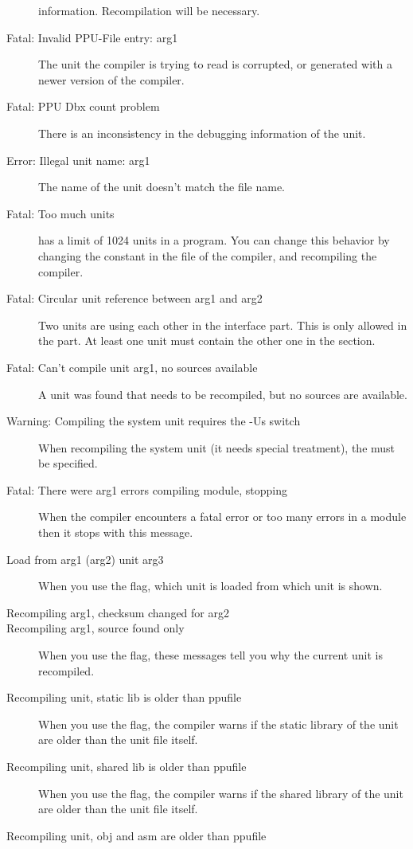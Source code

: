 \begin{description}
 information. Recompilation will be necessary.
\item [Fatal: Invalid PPU-File entry: arg1]
 The unit the compiler is trying to read is corrupted, or generated with a
 newer version of the compiler.
\item [Fatal: PPU Dbx count problem]
 There is an inconsistency in the debugging information of the unit.
\item [Error: Illegal unit name: arg1]
 The name of the unit doesn't match the file name.
\item [Fatal: Too much units]
 \fpc has a limit of 1024 units in a program. You can change this behavior
 by changing the  constant in the  file of the
 compiler, and recompiling the compiler.
\item [Fatal: Circular unit reference between arg1 and arg2]
 Two units are using each other in the interface part. This is only allowed
 in the  part. At least one unit must contain the other one
 in the  section.
\item [Fatal: Can't compile unit arg1, no sources available]
 A unit was found that needs to be recompiled, but no sources are
 available.
\item [Warning: Compiling the system unit requires the -Us switch]
 When recompiling the system unit (it needs special treatment), the
  must be specified.
\item [Fatal: There were arg1 errors compiling module, stopping]
 When the compiler encounters a fatal error or too many errors in a module
 then it stops with this message.
\item [Load from arg1 (arg2) unit arg3]
 When you use the  flag, which unit is loaded from which unit is
 shown.
\item [Recompiling arg1, checksum changed for arg2]
\item [Recompiling arg1, source found only]
 When you use the  flag, these messages tell you why the current
 unit is recompiled.
\item [Recompiling unit, static lib is older than ppufile]
 When you use the  flag, the compiler warns if the static library
 of the unit are older than the unit file itself.
\item [Recompiling unit, shared lib is older than ppufile]
 When you use the  flag, the compiler warns if the shared library
 of the unit are older than the unit file itself.
\item [Recompiling unit, obj and asm are older than ppufile]

\end{description}
